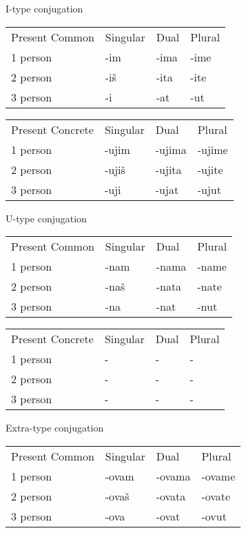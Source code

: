 I-type conjugation

\begin{table}
	\begin{tabular}{llll}
		Present Common & Singular & Dual & Plural \\
		1 person & -im & -ima & -ime \\
		2 person & -iš & -ita & -ite \\
		3 person & -i & -at & -ut
	\end{tabular}
\end{table}


\begin{table}
	\begin{tabular}{llll}
		Present Concrete & Singular & Dual & Plural \\
		1 person & -ujim & -ujima & -ujime \\
		2 person & -ujiš & -ujita & -ujite \\
		3 person & -uji & -ujat & -ujut
	\end{tabular}
\end{table}

U-type conjugation

\begin{table}
	\begin{tabular}{llll}
		Present Common & Singular & Dual & Plural \\
		1 person & -nam & -nama & -name \\
		2 person & -naš & -nata & -nate \\
		3 person & -na & -nat & -nut
	\end{tabular}
\end{table}


\begin{table}
	\begin{tabular}{llll}
		Present Concrete & Singular & Dual & Plural \\
		1 person & - & - & - \\
		2 person & - & - & - \\
		3 person & - & - & -
	\end{tabular}
\end{table}

Extra-type conjugation

\begin{table}
	\begin{tabular}{llll}
		Present Common & Singular & Dual & Plural \\
		1 person & -ovam & -ovama & -ovame \\
		2 person & -ovaš & -ovata & -ovate \\
		3 person & -ova & -ovat & -ovut
	\end{tabular}
\end{table}


